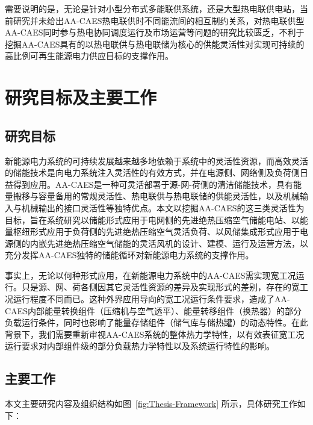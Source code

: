 需要说明的是，无论是针对小型分布式多能联供系统，还是大型热电联供电站，当前研究并未给出AA-CAES热电联供时不同能流间的相互制约关系，对热电联供型AA-CAES同时参与热电协同调度运行及市场运营等问题的研究比较匮乏，不利于挖掘AA-CAES具有的以热电联供与热电联储为核心的供能灵活性对实现可持续的高比例可再生能源电力供应目标的支撑作用。

\section{研究目标及主要工作}
\label{sec:mind-work}
\subsection{研究目标}
新能源电力系统的可持续发展越来越多地依赖于系统中的灵活性资源，而高效灵活的储能技术是向电力系统注入灵活性的有效方式，并在电源侧、网络侧及负荷侧日益得到应用。AA-CAES是一种可灵活部署于源-网-荷侧的清洁储能技术，具有能量搬移与容量备用的常规灵活性、热电联供与热电联储的供能灵活性，以及机械输入与机械输出的接口灵活性等独特优点。本文以挖掘AA-CAES的这三类灵活性为目标，旨在系统研究以储能形式应用于电网侧的先进绝热压缩空气储能电站、以能量枢纽形式应用于负荷侧的先进绝热压缩空气灵活负荷、以风储集成形式应用于电源侧的内嵌先进绝热压缩空气储能的灵活风机的设计、建模、运行及运营方法，以充分发挥AA-CAES独特的储能循环对新能源电力系统的支撑作用。

事实上，无论以何种形式应用，在新能源电力系统中的AA-CAES需实现宽工况运行。只是源、网、荷各侧因其它灵活性资源的差异及实现形式的差别，存在的宽工况运行程度不同而已。这种外界应用导向的宽工况运行条件要求，造成了AA-CAES内部能量转换组件（压缩机与空气透平）、能量转移组件（换热器）的部分负载运行条件，同时也影响了能量存储组件（储气库与储热罐）的动态特性。在此背景下，我们需要重新审视AA-CAES系统的整体热力学特性，以有效表征宽工况运行要求对内部组件级的部分负载热力学特性以及系统运行特性的影响。

\subsection{主要工作}

本文主要研究内容及组织结构如图~\ref{fig:Thesis-Framework} 所示，具体研究工作如下：

